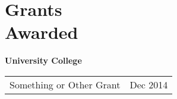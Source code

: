 \newpage
\section{\sc Grants\\ Awarded}
{\bf{University College}}\\
\begin{tabular}{@{}p{4in}p{2in}}
Something or Other Grant & Dec 2014\\
\end{tabular}
\endinput
